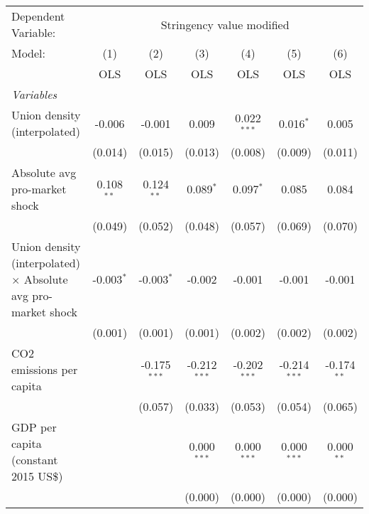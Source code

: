 
\begingroup
\centering
\begin{tabular}{lcccccc}
   \toprule
   Dependent Variable: & \multicolumn{6}{c}{Stringency value modified}\\
   Model:                                                               & (1)          & (2)            & (3)            & (4)            & (5)            & (6)\\  
                                                                        &  OLS         & OLS            & OLS            & OLS            & OLS            & OLS\\  
   \midrule
   \emph{Variables}\\
   Union density (interpolated)                                         & -0.006       & -0.001         & 0.009          & 0.022$^{***}$  & 0.016$^{*}$    & 0.005\\   
                                                                        & (0.014)      & (0.015)        & (0.013)        & (0.008)        & (0.009)        & (0.011)\\   
   Absolute avg pro-market shock                                        & 0.108$^{**}$ & 0.124$^{**}$   & 0.089$^{*}$    & 0.097$^{*}$    & 0.085          & 0.084\\   
                                                                        & (0.049)      & (0.052)        & (0.048)        & (0.057)        & (0.069)        & (0.070)\\   
   Union density (interpolated) $\times$ Absolute avg pro-market shock  & -0.003$^{*}$ & -0.003$^{*}$   & -0.002         & -0.001         & -0.001         & -0.001\\   
                                                                        & (0.001)      & (0.001)        & (0.001)        & (0.002)        & (0.002)        & (0.002)\\   
   CO2 emissions per capita                                             &              & -0.175$^{***}$ & -0.212$^{***}$ & -0.202$^{***}$ & -0.214$^{***}$ & -0.174$^{**}$\\   
                                                                        &              & (0.057)        & (0.033)        & (0.053)        & (0.054)        & (0.065)\\   
   GDP per capita (constant 2015 US\$)                                  &              &                & 0.000$^{***}$  & 0.000$^{***}$  & 0.000$^{***}$  & 0.000$^{**}$\\   
                                                                        &              &                & (0.000)        & (0.000)        & (0.000)        & (0.000)\\   

\end{tabular}
